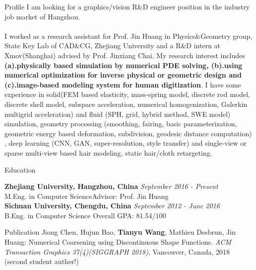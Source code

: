 \documentclass{resume} %
\begin{document}
\begin{rSection}{Profile}
I am looking for a graphics/vision R\&D engineer position in the industry job market of Hangzhou.\\\\ I worked as a research assistant for Prof. Jin Huang in Physics\&Geometry group, State Key Lab of CAD\&CG, Zhejiang University and a R\&D intern at Xmov(Shanghai) advised by Prof. Jinxiang Chai. My research interest includes \textbf{(a).physically based simulation by numerical PDE solving, (b).using numerical optimization for inverse physical or geometric design and (c).image-based modeling system for human digitization}. I have some experience in solid(FEM based elasticity, mass-spring model, discrete rod model, discrete shell model, subspace acceleration, numerical homogenization, Galerkin multigrid acceleration) and fluid (SPH, grid, hybrid method, SWE model) simulation, geometry processing (smoothing, fairing, basic parameterization, geometric energy based deformation, subdivision, geodesic distance computation) , deep learning (CNN, GAN, super-resolution, style transfer) and single-view or sparse multi-view based hair modeling, static hair/cloth retargeting.
\end{rSection}

\begin{rSection}{Education}

{\bf Zhejiang University, Hangzhou, China} \hfill {\em September 2016 - Present} 
\\ M.Eng. in Computer Science\hfill {Advisor: Prof. Jin Huang} 
\\{\bf Sichuan University, Chengdu, China} \hfill {\em September 2012 - June 2016} 
\\ B.Eng. in Computer Science\hfill { Overall GPA: 81.54/100 }

\end{rSection}

\begin{rSection}{Publication}
Jiong Chen, Hujun Bao, \textbf{Tianyu Wang}, Mathieu Desbrun, Jin Huang: Numerical Coarsening using Discontinuous Shape Functions. \emph{ACM Transaction Graphics 37(4)(SIGGRAPH 2018)}, Vancouver, Canada, 2018 (second student auther!)
\end{rSection}

\iffalse
\begin{rSection}{Work Experience}
\end{rSection}
\fi
\end{document}
